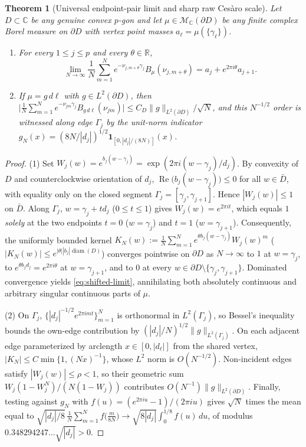 \documentclass[11pt,reqno]{amsart}
\newtheorem{theorem}{Theorem}[section]
\theoremstyle{definition}
\theoremstyle{remark}
\newcommand{\C}{\mathbb{C}}
\newcommand{\R}{\mathbb{R}}
\begin{document}
\begin{theorem}[Universal endpoint-pair limit and sharp raw Ces\`aro scale]\label{thm:endpoint-limit}
Let $D \subset \C$ be any genuine convex $p$-gon and let $\mu \in \mathcal{M}_\C(\partial D)$ be any finite complex Borel measure on $\partial D$ with vertex point masses $a_\ell = \mu(\{\gamma_\ell\})$.
\begin{enumerate}
  \item For every $1 \le j \le p$ and every $\theta \in \R$,
  \begin{equation}\label{eq:shifted-limit}
    \lim_{N\to\infty} \frac{1}{N} \sum_{m=1}^N e^{-\nu_{j,m+\theta}\gamma_j} B_\mu(\nu_{j,m+\theta})
    = a_j + e^{2\pi i\theta} a_{j+1}.
  \end{equation}
  \item If $\mu = g\,d\ell$ with $g \in L^2(\partial D)$, then $\bigl|\frac{1}{N}\sum_{m=1}^N e^{-\nu_{jm}\gamma_j} B_{g\,d\ell}(\nu_{jm})\bigr| \le C_D \|g\|_{L^2(\partial D)} / \sqrt{N}$, and this $N^{-1/2}$ order is witnessed along edge $\Gamma_j$ by the unit-norm indicator $g_N(x) = (8N/|d_j|)^{1/2} \mathbf{1}_{[0, |d_j|/(8N)]}(x)$.
\end{enumerate}
\end{theorem}

\begin{proof}
(1) Set $W_j(w) = e^{b_j(w - \gamma_j)} = \exp(2\pi i(w - \gamma_j)/d_j)$. By convexity of $D$ and counterclockwise orientation of $d_j$, $\operatorname{Re}\bigl(b_j(w - \gamma_j)\bigr) \le 0$ for all $w \in \bar D$, with equality only on the closed segment $\Gamma_j = [\gamma_j, \gamma_{j+1}]$. Hence $|W_j(w)| \le 1$ on $\bar D$. Along $\Gamma_j$, $w = \gamma_j + t d_j$ ($0 \le t \le 1$) gives $W_j(w) = e^{2\pi i t}$, which equals $1$ \emph{solely} at the two endpoints $t = 0$ ($w = \gamma_j$) and $t = 1$ ($w = \gamma_{j+1}$). Consequently, the uniformly bounded kernel $K_N(w) := \frac{1}{N}\sum_{m=1}^N e^{\theta b_j(w-\gamma_j)} W_j(w)^m$ ($|K_N(w)| \le e^{|\theta| |b_j| \operatorname{diam}(D)}$) converges pointwise on $\partial D$ as $N \to \infty$ to $1$ at $w = \gamma_j$, to $e^{\theta b_j d_j} = e^{2\pi i\theta}$ at $w = \gamma_{j+1}$, and to $0$ at every $w \in \partial D \setminus \{\gamma_j,\gamma_{j+1}\}$. Dominated convergence yields \eqref{eq:shifted-limit}, annihilating both absolutely continuous and arbitrary singular continuous parts of $\mu$.

(2) On $\Gamma_j$, $\{|d_j|^{-1/2} e^{2\pi i m t}\}_{m=1}^N$ is orthonormal in $L^2(\Gamma_j)$, so Bessel's inequality bounds the own-edge contribution by $(|d_j|/N)^{1/2}\|g\|_{L^2(\Gamma_j)}$. On each adjacent edge parameterized by arclength $x \in [0, |d_\ell|]$ from the shared vertex, $|K_N| \le C\min\{1, (N x)^{-1}\}$, whose $L^2$ norm is $O(N^{-1/2})$. Non-incident edges satisfy $|W_j(w)| \le \rho < 1$, so their geometric sum $W_j(1 - W_j^N)/(N(1 - W_j))$ contributes $O(N^{-1})\|g\|_{L^2(\partial D)}$. Finally, testing against $g_N$ with $f(u) = (e^{2\pi i u}-1)/(2\pi i u)$ gives $\sqrt{N}$ times the mean equal to $\sqrt{|d_j|/8}\,\frac{1}{N}\sum_{m=1}^N f\bigl(\frac{m}{8N}\bigr) \to \sqrt{8|d_j|}\int_0^{1/8} f(u)\,du$, of modulus $0.348294247\dots\sqrt{|d_j|} > 0$.
\end{proof}
\end{document}
